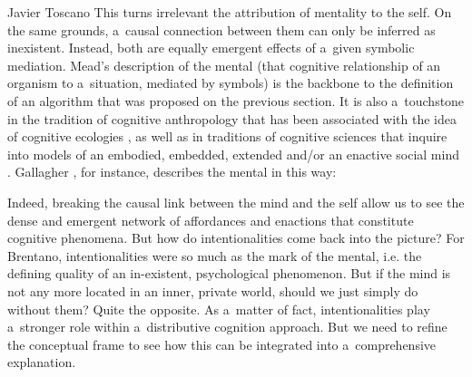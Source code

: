 \begin{artengenv}{Javier Toscano}
This turns irrelevant the attribution of mentality to the self. On the same grounds, a~causal connection between them can only be inferred as inexistent. Instead, both are equally emergent effects of a~given symbolic mediation. Mead's description of the mental (that cognitive relationship of an organism to a~situation, mediated by symbols) is the backbone to the definition of an algorithm that was proposed on the previous section. It is also a~touchstone in the tradition of cognitive anthropology that has been associated with the idea of cognitive ecologies
\parencites[][]{douglas_how_1986}[][]{lave_cognition_1988}[][]{connerton_how_1989}[][]{hutchins_cognition_1995}[][]{hutchins_cognitive_2010}, %
 as well as in traditions of cognitive sciences that inquire into models of an embodied, embedded, extended and/or an enactive social mind 
\parencites[][]{clark_being_1997}[][]{clark_natural-born_2003}[][]{clark_what_2015}[][]{clark_extended_1998}[][]{gallagher_how_2005}[][]{gallagher_socially_2013}[][]{gallagher_neo-pragmatism_2012}. %
 Gallagher 
\parencite*[][p.4]{gallagher_socially_2013}, %
 for instance, describes the mental in this way:

Indeed, breaking the causal link between the mind and the self allow us to see the dense and emergent network of affordances and enactions that constitute cognitive phenomena. But how do intentionalities come back into the picture? For Brentano, intentionalities were so much as the mark of the mental, i.e. the defining quality of an in-existent, psychological phenomenon. But if the mind is not any more located in an inner, private world, should we just simply do without them? Quite the opposite. As a~matter of fact, intentionalities play a~stronger role within a~distributive cognition approach. But we need to refine the conceptual frame to see how this can be integrated into a~comprehensive explanation.


\end{artengenv}
